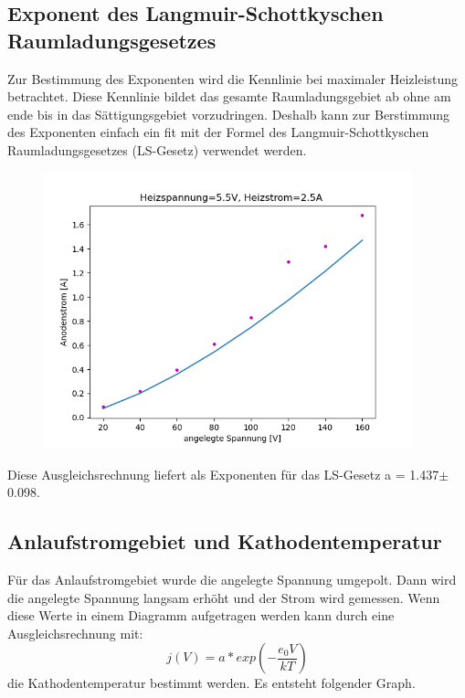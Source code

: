 \subsection{Exponent des Langmuir-Schottkyschen Raumladungsgesetzes}

Zur Bestimmung des Exponenten wird die Kennlinie bei maximaler Heizleistung betrachtet. Diese Kennlinie bildet das gesamte Raumladungsgebiet ab ohne am ende bis in das Sättigungsgebiet vorzudringen. Deshalb kann zur Berstimmung des Exponenten einfach ein fit mit der Formel des Langmuir-Schottkyschen Raumladungsgesetzes (LS-Gesetz) verwendet werden. 

\begin{figure}[H]
    \centering
    \includegraphics[height=8cm]{"LS.png"}
\end{figure}

\noindent Diese Ausgleichsrechnung liefert als Exponenten für das LS-Gesetz a = 1.437$\pm$0.098.

\subsection{Anlaufstromgebiet und Kathodentemperatur}

Für das Anlaufstromgebiet wurde die angelegte Spannung umgepolt. Dann wird die angelegte Spannung langsam erhöht und der Strom wird gemessen. Wenn diese Werte in einem Diagramm aufgetragen werden kann durch eine Ausgleichsrechnung mit:
\begin{displaymath}
    j(V)= a*exp \left(-\frac{e_0 V}{kT} \right)
\end{displaymath}
\noindent die Kathodentemperatur bestimmt werden. Es entsteht folgender Graph.

